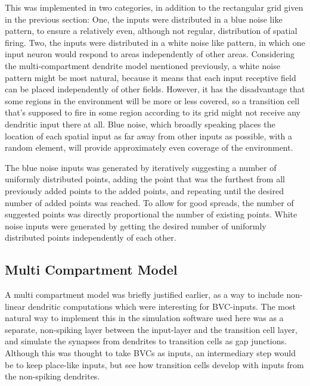 \documentclass{article}
\begin{document}
    This was implemented in two categories, in addition to the rectangular grid given in the previous section: One, the inputs were distributed in a blue noise like pattern, to ensure a relatively even, although not regular, distribution of spatial firing. Two, the inputs were distributed in a white noise like pattern, in which one input neuron would respond to areas independently of other areas.
    Considering the multi-compartment dendrite model mentioned previously, a white noise pattern might be most natural, because it means that each input receptive field can be placed independently of other fields. However, it has the disadvantage that some regions in the environment will be more or less covered, so a transition cell that's supposed to fire in some region according to its grid might not receive any dendritic input there at all. Blue noise, which broadly speaking places the location of each spatial input as far away from other inputs as possible, with a random element, will provide approximately even coverage of the environment.
    
    The blue noise inputs was generated by iteratively suggesting a number of uniformly distributed points, adding the point that was the furthest from all previously added points to the added points, and repeating until the desired number of added points was reached. To allow for good spreads, the number of suggested points was directly proportional the number of existing points.
    White noise inputs were generated by getting the desired number of uniformly distributed points independently of each other.

    \subsection{Multi Compartment Model}
    A multi compartment model was briefly justified earlier, as a way to include non-linear dendritic computations which were interesting for BVC-inputs. The most natural way to implement this in the simulation software used here was as a separate, non-spiking layer between the input-layer and the transition cell layer, and simulate the synapses from dendrites to transition cells as gap junctions. Although this was thought to take BVCs as inputs, an intermediary step would be to keep place-like inputs, but see how transition cells develop with inputs from the non-spiking dendrites.
\end{document}
